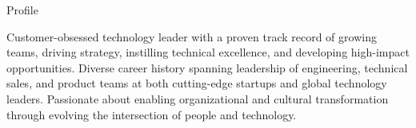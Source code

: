 \documentclass{resume} %
\begin{document}
\vspace{-1em}
\begin{rSection}{Profile}
  
  Customer-obsessed technology leader with a proven track record of growing teams, driving strategy, instilling technical excellence, and developing high-impact opportunities. Diverse career history spanning leadership of engineering, technical sales, and product teams at both cutting-edge startups and global technology leaders. Passionate about enabling organizational and cultural transformation through evolving the intersection of people and technology.
  
\end{rSection}


\end{document}
